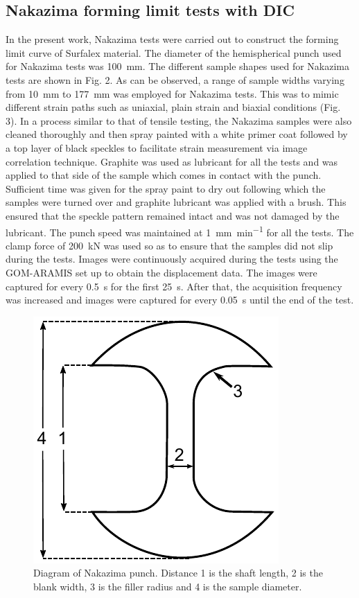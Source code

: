 \documentclass[11pt]{article} %
\begin{document}
\subsection{Nakazima forming limit tests with DIC}
In the present work, Nakazima tests were carried out to construct the forming limit curve of Surfalex material. The diameter of the hemispherical punch used for Nakazima tests was \SI{100}{\milli\meter}. The different sample shapes used for Nakazima tests are shown in Fig. 2. As can be observed, a range of sample widths varying from \SI{10}{\milli\meter} to \SI{177}{\milli\meter} was employed for Nakazima tests. This was to mimic different strain paths such as uniaxial, plain strain and biaxial conditions (Fig. 3). In a process similar to that of tensile testing, the Nakazima samples were also cleaned thoroughly and then spray painted with a white primer coat followed by a top layer of black speckles to facilitate strain measurement via image correlation technique. Graphite was used as lubricant for all the tests and was applied to that side of the sample which comes in contact with the punch. Sufficient time was given for the spray paint to dry out following which the samples were turned over and graphite lubricant was applied with a brush. This ensured that the speckle pattern remained intact and was not damaged by the lubricant. The punch speed was maintained at \SI{1}{\milli\meter\per\minute} for all the tests. The clamp force of \SI{200}{\kilo\newton} was used so as to ensure that the samples did not slip during the tests. Images were continuously acquired during the tests using the GOM-ARAMIS set up to obtain the displacement data. The images were captured for every \SI{0.5}{\second} for the first \SI{25}{\second}. After that, the acquisition frequency was increased and images were captured for every \SI{0.05}{\second} until the end of the test. 

\begin{figure}[h]
	\includegraphics{images/nakazima_punch}
	\centering
	\caption{Diagram of Nakazima punch. Distance 1 is the shaft length, 2 is the blank width, 3 is the filler radius and 4 is the sample diameter.}
\end{figure}
\end{document}

